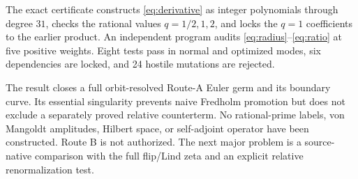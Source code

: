 \documentclass[11pt]{article}
\begin{document}
The exact certificate constructs \eqref{eq:derivative} as integer
polynomials through degree $31$, checks the rational values
$q=1/2,1,2$, and locks the $q=1$ coefficients to the earlier product.
An independent program audits \eqref{eq:radius}--\eqref{eq:ratio} at five
positive weights.  Eight tests pass in normal and optimized modes, six
dependencies are locked, and 24 hostile mutations are rejected.

The result closes a full orbit-resolved Route-A Euler germ and its boundary
curve.  Its essential singularity prevents naive Fredholm promotion but does
not exclude a separately proved relative counterterm.  No rational-prime
labels, von Mangoldt amplitudes, Hilbert space, or self-adjoint operator have
been constructed.  Route B is not authorized.  The next major problem is a
source-native comparison with the full flip/Lind zeta and an explicit
relative renormalization test.



\end{document}
